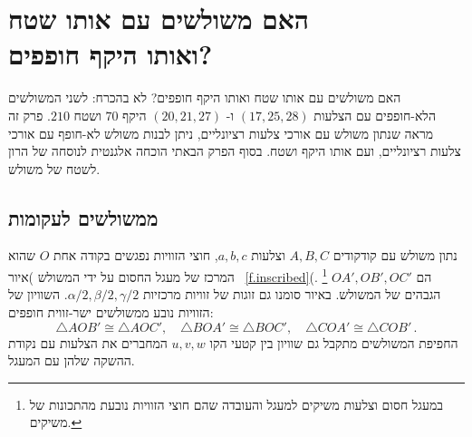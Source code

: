 
\chapter[\R{האם משולשים עם אותו שטח ואותו היקף חופפים?}]{האם משולשים עם אותו שטח\\
ואותו היקף חופפים?}
\label{c.congruent}


האם משולשים עם אותו שטח ואותו היקף חופפים? לא בהכרח: לשני המשולשים הלא-חופפים עם הצלעות
$(17,25,28)$
ו-%
$(20,21,27)$
היקף
$70$
ושטח 
$210$.
פרק זה מראה שנתון משולש עם אורכי צלעות רציונליים, ניתן לבנות משולש לא-חופף עם אורכי צלעות רציונליים, ועם אותו היקף ושטח.
בסוף הפרק הבאתי הוכחה אלגנטית לנוסחה של הרון לשטח של משולש.


\section{ממשולשים לעקומות}

נתון משולש עם קודקודים
$A,B,C$
וצלעות
$a,b,c$,
חוצי הזוויות נפגשים בקודה אחת
$O$
שהוא המרכז של מעגל החסום על ידי המשולש )איור~%
\ref{f.inscribed}(.%
\footnote{במעגל חסום וצלעות משיקים למעגל והעובדה שהם חוצי הזוויות נובעת מהתכונות של משיקים.}
$OA',OB',OC'$
הם הגבהים של המשולש. באיור סומנו גם זוגות של זוויות מרכזיות
$\alpha/2,\beta/2,\gamma/2$.
השוויון של הזוויות נובע ממשולשים ישר-זווית חופפים:
\[
\triangle AOB'\cong \triangle AOC',\quad \triangle BOA'\cong \triangle BOC', \quad \triangle COA'\cong \triangle COB'\,.
\]
החפיפת המשולשים מתקבל גם שוויון בין קטעי הקו 
$u,v,w$
המחברים את הצלעות עם נקודת ההשקה שלהן עם המעגל.

\vspace{-3ex}

